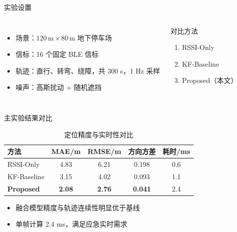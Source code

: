 \documentclass[aspectratio=169]{beamer}
\begin{document}
\begin{frame}{实验设置}
  \begin{columns}[T]
    \begin{itemize}
      \setlength{\itemsep}{5pt}
      \item 场景：$120\,\mathrm{m}\times 80\,\mathrm{m}$ 地下停车场
      \item 信标：16 个固定 BLE 信标
      \item 轨迹：直行、转弯、绕障，共 300 s，1 Hz 采样
      \item 噪声：高斯扰动 + 随机遮挡
    \end{itemize}
    \begin{block}{对比方法}
      \begin{enumerate}
        \item RSSI-Only
        \item KF-Baseline
        \item Proposed（本文）
      \end{enumerate}
    \end{block}
  \end{columns}
\end{frame}

\begin{frame}{主实验结果对比}
  \begin{table}
    \centering
    \caption{定位精度与实时性对比}
    \begin{tabular}{lcccc}
      \toprule
      方法 & MAE/m & RMSE/m & 方向方差 & 耗时/ms \\
      \midrule
      RSSI-Only & 4.83 & 6.21 & 0.198 & 0.6 \\
      KF-Baseline & 3.15 & 4.02 & 0.093 & 1.1 \\
      \textbf{Proposed} & \textbf{2.08} & \textbf{2.76} & \textbf{0.041} & 2.4 \\
      \bottomrule
    \end{tabular}
  \end{table}
  \begin{itemize}
    \item 融合模型精度与轨迹连续性明显优于基线
    \item 单帧计算 2.4 ms，满足应急实时需求
  \end{itemize}
\end{frame}
\end{document}
